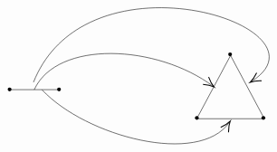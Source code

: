 \documentclass{article}
\begin{document}
\begin{example}
\[\begin{tikzpicture}[x=0.75pt,y=0.75pt,yscale=-1,xscale=1]
            \draw  [line width=3] [line join = round][line cap = round] (203.11,190.78) .. controls (203.11,190.78) and (203.11,190.78) .. (203.11,190.78) ;
            \draw  [line width=3] [line join = round][line cap = round] (151.11,190.78) .. controls (151.11,190.78) and (151.11,190.78) .. (151.11,190.78) ;
            \draw    (150,191) -- (204.11,191) ;
            \draw   (383.56,155) -- (419.11,221.67) -- (348,221.67) -- cycle ;
            \draw  [line width=3] [line join = round][line cap = round] (383.11,153.78) .. controls (383.11,153.78) and (383.11,153.78) .. (383.11,153.78) ;
            \draw  [line width=3] [line join = round][line cap = round] (348.11,220.78) .. controls (348.11,220.78) and (348.11,220.78) .. (348.11,220.78) ;
            \draw  [line width=3] [line join = round][line cap = round] (418.11,220.78) .. controls (418.11,220.78) and (418.11,220.78) .. (418.11,220.78) ;
            \draw    (185.24,191.2) .. controls (231.77,240.7) and (349.85,271.58) .. (382.28,225.62) ;
            \draw [shift={(383.24,224.2)}, rotate = 122.86] [color={rgb, 255:red, 0; green, 0; blue, 0 }  ][line width=0.75]    (10.93,-4.9) .. controls (6.95,-2.3) and (3.31,-0.67) .. (0,0) .. controls (3.31,0.67) and (6.95,2.3) .. (10.93,4.9)   ;
            \draw    (177.06,191) .. controls (201.12,138.47) and (306.18,143.15) .. (365.35,187.53) ;
            \draw [shift={(366.24,188.2)}, rotate = 217.33] [color={rgb, 255:red, 0; green, 0; blue, 0 }  ][line width=0.75]    (10.93,-4.9) .. controls (6.95,-2.3) and (3.31,-0.67) .. (0,0) .. controls (3.31,0.67) and (6.95,2.3) .. (10.93,4.9)   ;
            \draw    (176.24,183.2) .. controls (233.19,40.12) and (495.6,125.34) .. (405.62,182.35) ;
            \draw [shift={(404.24,183.2)}, rotate = 328.77] [color={rgb, 255:red, 0; green, 0; blue, 0 }  ][line width=0.75]    (10.93,-4.9) .. controls (6.95,-2.3) and (3.31,-0.67) .. (0,0) .. controls (3.31,0.67) and (6.95,2.3) .. (10.93,4.9)   ;
            

\end{tikzpicture}\]
\end{example}
\end{document}
